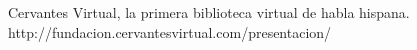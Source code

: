 \cite{}  
  Cervantes Virtual, la primera biblioteca virtual de habla hispana.
http://fundacion.cervantesvirtual.com/presentacion/
  
  
  \cite{222}